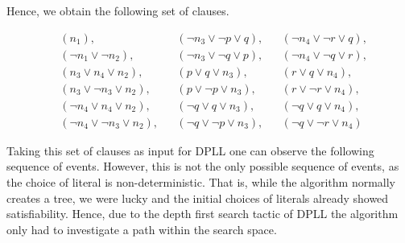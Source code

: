 \documentclass[11pt,a4paper]{article}
\begin{document}
Hence, we obtain the following set of clauses.

\begin{align*}
&(n_1),& & (\neg n_3 \lor \neg p \lor q), & & (\neg n_4 \lor \neg r \lor q),\\ 
&(\neg n_1 \lor \neg n_2),& & (\neg n_3 \lor \neg q \lor p),  && (\neg n_4 \lor \neg q \lor r), \\
&(n_3 \lor n_4 \lor n_2),& & (p\lor q \lor n_3),  && (r \lor q \lor n_4), \\
&(n_3 \lor \neg  n_3 \lor n_2) ,  & & (p \lor \neg p \lor n_3), & & (r \lor \neg r \lor n_4), \\
&(\neg n_4 \lor  n_4 \lor n_2) , & & (\neg q \lor q \lor n_3),& & (\neg q \lor q \lor n_4), \\
&(\neg n_4 \lor  \neg  n_3 \lor n_2), && (\neg q \lor \neg p \lor n_3), & & (\neg q \lor \neg r \lor n_4)
\end{align*}

%
Taking this set of clauses as input for DPLL one can observe the following sequence of events. However, this is not the only possible sequence of events, as the choice of literal is non-deterministic. That is, while the algorithm normally creates a tree, we were lucky and the initial choices of literals already showed satisfiability. Hence, due to the depth first search tactic of DPLL the algorithm only had to investigate a path within the search space.
\end{document}
